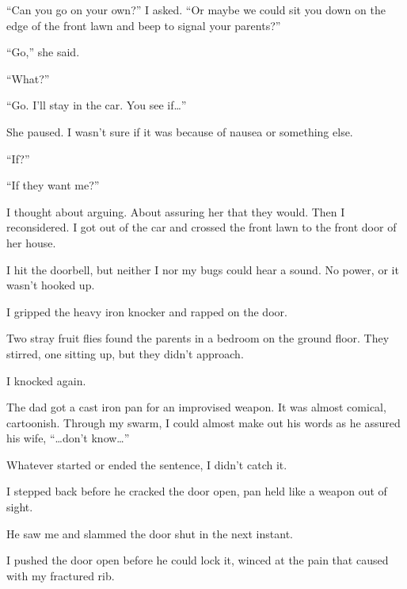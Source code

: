 ``Can you go on your own?'' I asked.  ``Or maybe we could sit you down on the edge of the front lawn and beep to signal your parents?''



``Go,'' she said.



``What?''



``Go.  I'll stay in the car.  You see if\ldots''



She paused.  I wasn't sure if it was because of nausea or something else.



``If?''



``If they want me?''



I thought about arguing.  About assuring her that they would.  Then I reconsidered.  I got out of the car and crossed the front lawn to the front door of her house.



I hit the doorbell, but neither I nor my bugs could hear a sound.  No power, or it wasn't hooked up.



I gripped the heavy iron knocker and rapped on the door.



Two stray fruit flies found the parents in a bedroom on the ground floor.  They stirred, one sitting up, but they didn't approach.



I knocked again.



The dad got a cast iron pan for an improvised weapon.  It was almost comical, cartoonish.  Through my swarm, I could almost make out his words as he assured his wife,  ``\ldots{}don't know\ldots''



Whatever started or ended the sentence, I didn't catch it.



I stepped back before he cracked the door open, pan held like a weapon out of sight.



He saw me and slammed the door shut in the next instant.



I pushed the door open before he could lock it, winced at the pain that caused with my fractured rib.



